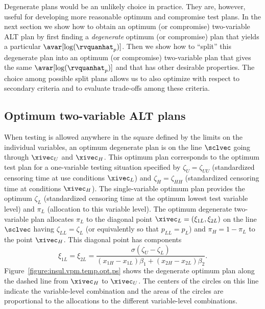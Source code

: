 Degenerate plans would be an unlikely choice in practice. They are,
however, useful for developing more reasonable optimum and
compromise test plans.  In the next section we show how to obtain an
optimum (or compromise) two-variable ALT plan by first finding a
{\em degenerate} optimum (or compromise) plan that yields a
particular $\avar[\log(\rvquanhat_{p})]$.  Then we show how to
``split'' this degenerate plan into an optimum (or compromise)
two-variable plan that gives the same $\avar[\log(\rvquanhat_{p})]$
and that has other desirable properties.  The choice among possible
split plans allows us to also optimize with respect to secondary
criteria and to evaluate trade-offs among these criteria.

\subsection{Optimum two-variable ALT plans}
\label{section:opt.tvalt}
When testing is allowed anywhere in the square defined by the limits on
the individual variables, an optimum degenerate plan is on the 
line $\sclvec$ going
through $\xivec_{U}$ and $\xivec_{H}$.  This optimum plan corresponds
to the optimum test plan for a one-variable testing situation
specified by
$\zeta_{U}=\zeta_{UU}$ (standardized censoring time at use
conditions $\xivec_{L}$) and $\zeta_{H}=\zeta_{HH}$ (standardized censoring time at
conditions $\xivec_{H}$).  The
single-variable optimum plan provides the optimum $\zeta_{L}$
(standardized censoring time at the optimum lowest test variable level)
and $\pi_{L}$ (allocation to this variable level).  The optimum
degenerate two-variable plan allocates $\pi_{L}$ 
to the diagonal
point 
$\xivec_{L}=(\xi_{1L},\xi_{2L})$  on the
line $\sclvec$ having $\zeta_{LL}=\zeta_{L}$ (or equivalently so that
$p_{LL}=p_{L}$) and $\pi_{H}=1-\pi_{L}$ to the point $\xivec_{H}$.
This diagonal point has components
\begin{equation}
\label{equation:diagonal.points}
\xi_{1L}=\xi_{2L}=
\frac{
\sigma (\zeta_{U}-\zeta_{L})
     }
     {
(x_{1H}-x_{1L}) \beta_{1} +
(x_{2H}-x_{2L}) \beta_{2} 
     }.
\end{equation}
Figure~\ref{figure:insul.vpm.temp.opt.ps} shows the
degenerate optimum plan along the dashed line from $\xivec_{H}$ to
$\xivec_{U}$. The centers of the circles on this line
indicate the variable-level combination and the areas of the circles are
proportional to the allocations to the different variable-level
combinations.

